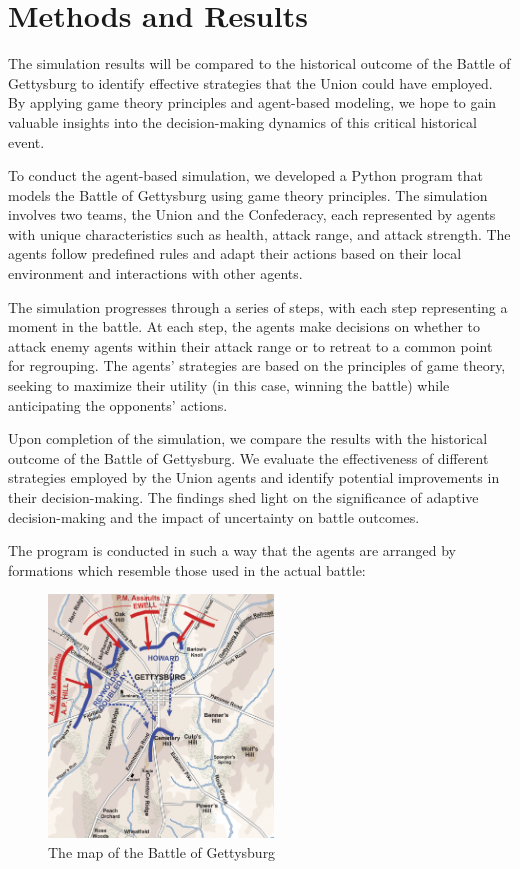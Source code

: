 \documentclass[final,5p,times,twocolumn,authoryear]{elsarticle}
\begin{document}
\section{Methods and Results}
The simulation results will be compared to the historical outcome of the Battle of Gettysburg to identify effective strategies that the Union could have employed. By applying game theory principles and agent-based modeling, we hope to gain valuable insights into the decision-making dynamics of this critical historical event. 

To conduct the agent-based simulation, we developed a Python program that models the Battle of Gettysburg using game theory principles. The simulation involves two teams, the Union and the Confederacy, each represented by agents with unique characteristics such as health, attack range, and attack strength. The agents follow predefined rules and adapt their actions based on their local environment and interactions with other agents.

The simulation progresses through a series of steps, with each step representing a moment in the battle. At each step, the agents make decisions on whether to attack enemy agents within their attack range or to retreat to a common point for regrouping. The agents' strategies are based on the principles of game theory, seeking to maximize their utility (in this case, winning the battle) while anticipating the opponents' actions.

Upon completion of the simulation, we compare the results with the historical outcome of the Battle of Gettysburg. We evaluate the effectiveness of different strategies employed by the Union agents and identify potential improvements in their decision-making. The findings shed light on the significance of adaptive decision-making and the impact of uncertainty on battle outcomes.

The program is conducted in such a way that the agents are arranged by formations which resemble those used in the actual battle:

\begin{figure}[!ht]
  \centering
      \includegraphics[width=6cm]{Gettysburg_map.png}
      \caption{The map of the Battle of Gettysburg}
      \label{fig:Map}
  \centering
\end{figure}
\end{document}
